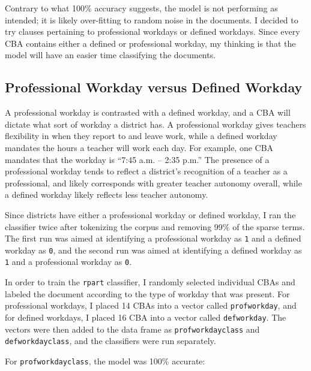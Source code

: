 Contrary to what 100\% accuracy suggests, the model is not performing as intended; it is likely over-fitting to random noise in the documents. I decided to try clauses pertaining to professional workdays or defined workdays. Since every CBA contains either a defined or professional workday, my thinking is that the model will have an easier time classifying the documents. 

\subsection{Professional Workday versus Defined Workday}

A professional workday is contrasted with a defined workday, and a CBA will dictate what sort of workday a district has. A professional workday gives teachers flexibility in when they report to and leave work, while a defined workday mandates the hours a teacher will work each day.  For example, one CBA mandates that the workday is “7:45 a.m. – 2:35 p.m.” The presence of a professional workday tends to reflect a district’s recognition of a teacher as a professional, and likely corresponds with greater teacher autonomy overall, while a defined workday likely reflects less teacher autonomy.

Since districts have either a professional workday or defined workday, I ran the classifier twice after tokenizing the corpus and removing 99\% of the sparse terms. The first run was aimed at identifying a professional workday as \texttt{1} and a defined workday as \texttt{0}, and the second run was aimed at identifying a defined workday as \texttt{1} and a professional workday as \texttt{0}.

In order to train the \texttt{rpart} classifier, I randomly selected individual CBAs and labeled the document according to the type of workday that was present. For professional workdays, I placed 14 CBAs into a vector called \texttt{profworkday}, and for defined workdays, I placed 16 CBA into a vector called \texttt{defworkday}. The vectors were then added to the data frame as \texttt{profworkdayclass} and \texttt{defworkdayclass}, and the classifiers were run separately. 

\pagebreak For \texttt{profworkdayclass}, the model was 100\% accurate:

